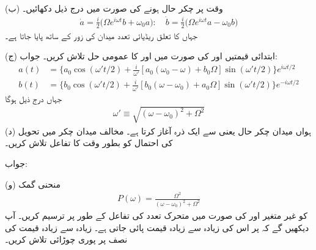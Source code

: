 (ب) وقت  پر  چکر حال ہونے کی صورت میں درج ذیل دکھائیں۔
\begin{align}
	\dot{a} = \frac{i}{2}\big(\Omega e^{i\omega t}b+\omega_0 a\big):\quad\dot{b} = \frac{i}{2}\big(\Omega e^{i\omega t}a-\omega_0 b\big)
\end{align}
جہاں  کا تعلق ریڈیائی تعدد میدان کی زور کے ساتھ پایا جاتا ہے۔

(ج) ابتدائی قیمتیں  اور  کی صورت میں  اور  کا عمومی حل تلاش کریں۔ جواب: 
\begin{align*}
	a(t) &= \bigg\{a_0\cos(\omega't/2)+\frac{i}{\omega'}[a_0(\omega_0-\omega)+b_0\Omega]\sin(\omega't/2)\bigg\}e^{i\omega t/2} \\
	b(t) &= \bigg\{b_0\cos(\omega't/2)+\frac{i}{\omega'}[b_0(\omega-\omega_0)+a_0\Omega]\sin(\omega't/2)\bigg\}e^{-i\omega t/2}
\end{align*}
جہاں درج ذیل ہوگا
\begin{align}
	\omega'\equiv\sqrt{(\omega-\omega_0)^2+\Omega^2}
\end{align}
(د) ہواں میدان چکر حال یعنی  سے ایک ذرہ آغاز کرتا ہے۔ مخالف میدان چکر میں تحویل کی احتمال کو بطور وقت کا تفاعل تلاش کریں۔

جواب: 

(و) منحنی گمک
\begin{align}
	P(\omega) = \frac{\Omega^2}{(\omega-\omega_0)^2+\Omega^2}
\end{align}
کو غیر متغیر  اور  کی صورت میں متحرک تعدد  کی تفاعل کے طور پر ترسیم کریں۔ آپ دیکھیں گے کہ  پر اس کی زیادہ سے زیادہ قیمت پائی جاتی ہے۔ زیادہ سے زیادہ قیمت کی نصف پر پوری چوڑائی  تلاش کریں۔

